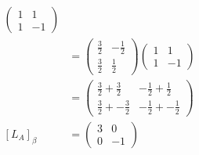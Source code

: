 \documentclass[13pt]{article}
\begin{document}
\begin{enumerate}[label=(\alph*),leftmargin=*]
\begin{align*}
\begin{pmatrix}
                    1 & 1 \\
                    1 & -1
                  \end{pmatrix} \\
                &=
                  \begin{pmatrix}
                    \frac{3}{2} & -\frac{1}{2} \\
                    \frac{3}{2} & \frac{1}{2}
                  \end{pmatrix}
                  \begin{pmatrix}
                    1 & 1 \\
                    1 & -1
                  \end{pmatrix} \\
                &=
                  \begin{pmatrix}
                    \frac{3}{2} + \frac{3}{2} & -\frac{1}{2} + \frac{1}{2} \\
                    \frac{3}{2} + -\frac{3}{2} & -\frac{1}{2} + -\frac{1}{2}                                        
                  \end{pmatrix} \\
    [L_A]_\beta &=
                  \begin{pmatrix}
                    3 & 0 \\
                    0 & -1
                  \end{pmatrix}
  \end{align*}


\end{enumerate}
\end{document}
